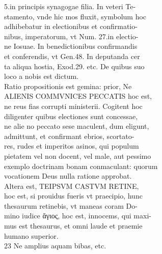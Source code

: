 \documentclass{article}
\begin{document}
\begin{pages}
                5.in principis synagogae filia. In veteri Te- \\
                stamento, vnde hic mos fluxit, symbolum hoc \\
                adhibebatur in electionibus et confirmatio- \\
                nibus, imperatorum, vt Num. 27.in electio- \\
                ne Iosuae. In benedictionibus confirmandis \\
                et conferendis, vt Gen.48. In deputanda cer \\
                ta aliqua hostia, Exod.29. etc. De quibus suo \\
                loco a nobis est dictum. \\
                Ratio propositionis est gemina: prior, Ne \\
                ALIENIS COMMVNICES PECCATIS hoc est, \\
                ne reus fias corrupti ministerii. Cogitent hoc \\
                diligenter quibus electiones sunt concessae, \\
                ne alie no peccato sese maculent, dum eligunt, \\
                admittunt, et confirmant ebrios, scortato- \\
                res, rudes et imperitos asinos, qui populum \\
                pietatem vel non docent, vel male, aut pessimo \\
                exemplo doctrinam bonam conmaculant: quorum \\
                vocationem Deus nulla ratione approbat. \\
                Altera est, TEIPSVM CASTVM RETINE, \\
                hoc est, si prouidus fueris vt praecipio, hunc \\
                thesaurum retinebis, vt maneas coram Do- \\
                mino iudice ἅγιος, hoc est, innocems, qui maxi- \\
                mus est thesaurus, et omni laude et praemie \\
                humano superior. \\
                23 Ne amplius aquam bibas, etc. \\

\end{pages}
\end{document}
